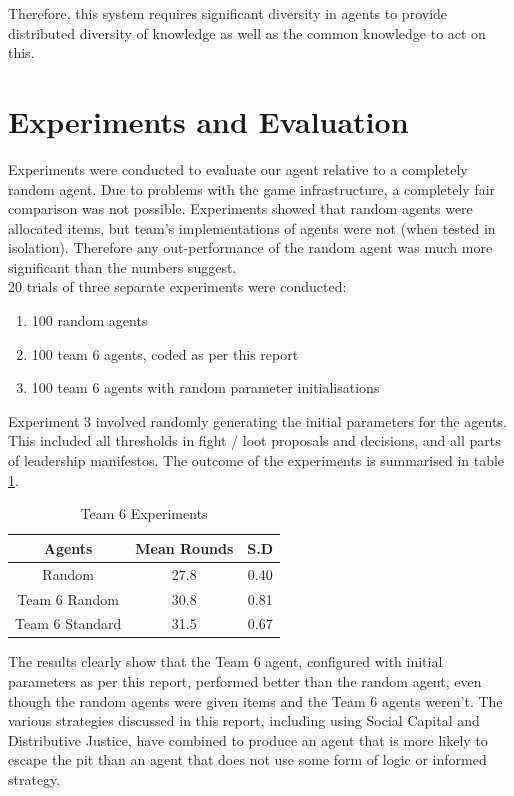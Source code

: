 Therefore, this system requires significant diversity in agents to provide distributed diversity of knowledge as well as the common knowledge to act on this. 


\section{Experiments and Evaluation}

Experiments were conducted to evaluate our agent relative to a completely random agent. Due to problems with the game infrastructure, a completely fair comparison was not possible. Experiments showed that random agents were allocated items, but team's implementations of agents were not (when tested in isolation). Therefore any out-performance of the random agent was much more significant than the numbers suggest.\\

20 trials of three separate experiments were conducted:

\begin{enumerate}
    \item 100 random agents
    \item 100 team 6 agents, coded as per this report
    \item 100 team 6 agents with random parameter initialisations
\end{enumerate}

Experiment 3 involved randomly generating the initial parameters for the agents. This included all thresholds in fight / loot proposals and decisions, and all parts of leadership manifestos. The outcome of the experiments is summarised in table \ref{tab:T6Experiments}.

\begin{table}[h]
    \centering
    \begin{tabular}{||c|c|c||}
        \hline
       Agents & Mean Rounds & S.D\\
       \hline \hline
       Random & 27.8 & 0.40\\
       \hline
       Team 6 Random & 30.8 & 0.81\\
       \hline
       Team 6 Standard & 31.5 & 0.67\\
       \hline
    \end{tabular}
    \caption{Team 6 Experiments}
    \label{tab:T6Experiments}
\end{table}

The results clearly show that the Team 6 agent, configured with initial parameters as per this report, performed better than the random agent, even though the random agents were given items and the Team 6 agents weren't. The various strategies discussed in this report, including using Social Capital and Distributive Justice, have combined to produce an agent that is more likely to escape the pit than an agent that does not use some form of logic or informed strategy.\\

